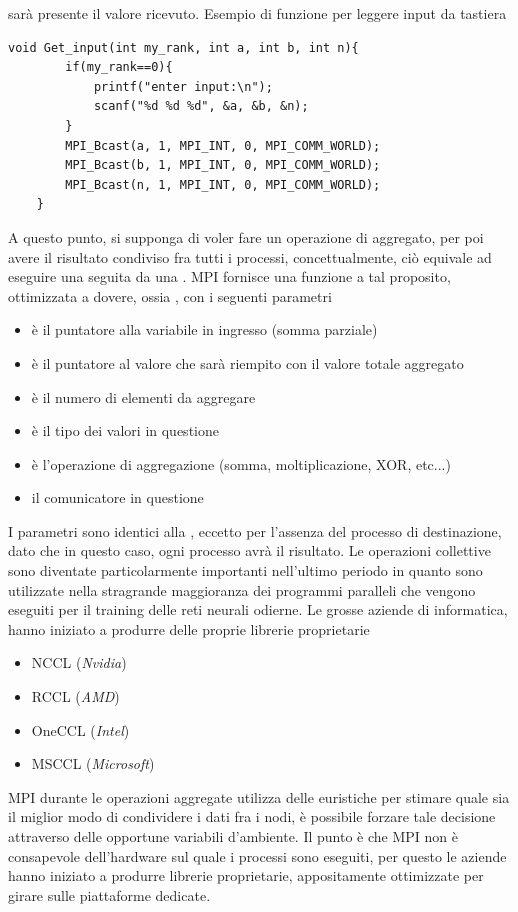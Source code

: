 \documentclass[10pt, letterpaper]{report}
\begin{document}
sarà presente il valore ricevuto.\acc 
Esempio di funzione per leggere input da tastiera 
\begin{lstlisting}[style=CStyle]
    void Get_input(int my_rank, int a, int b, int n){
        if(my_rank==0){
            printf("enter input:\n");
            scanf("%d %d %d", &a, &b, &n);
        }
        MPI_Bcast(a, 1, MPI_INT, 0, MPI_COMM_WORLD);
        MPI_Bcast(b, 1, MPI_INT, 0, MPI_COMM_WORLD);
        MPI_Bcast(n, 1, MPI_INT, 0, MPI_COMM_WORLD);
    }
\end{lstlisting}
A questo punto, si supponga di voler fare un operazione di aggregato, per poi avere il risultato condiviso fra tutti 
i processi, concettualmente, ciò equivale ad eseguire una  seguita da una . MPI 
fornisce una funzione a tal proposito, ottimizzata a dovere, ossia , con i seguenti parametri\begin{itemize}
    \item {} è il puntatore alla variabile in ingresso (somma parziale)
    \item {} è il puntatore al valore che sarà riempito con il valore totale aggregato
    \item {} è il numero di elementi da aggregare
    \item {} è il tipo dei valori in questione
    \item {} è l'operazione di aggregazione (somma, moltiplicazione, XOR, etc...) 
    \item {} il comunicatore in questione
\end{itemize}
I parametri sono identici alla ,  eccetto per l'assenza del processo di destinazione, dato che 
in questo caso, ogni processo avrà il risultato.\acc 
Le operazioni collettive sono diventate particolarmente importanti nell'ultimo periodo in quanto sono 
utilizzate nella stragrande maggioranza dei programmi paralleli che vengono eseguiti per il training delle 
reti neurali odierne. Le grosse aziende di informatica, hanno iniziato a produrre delle proprie librerie 
proprietarie\begin{itemize}
    \item NCCL (\textit{Nvidia})
    \item RCCL (\textit{AMD})
    \item OneCCL (\textit{Intel})
    \item MSCCL (\textit{Microsoft})
\end{itemize}
MPI durante le operazioni aggregate utilizza delle euristiche per stimare quale sia il miglior modo di condividere 
i dati fra i nodi, è possibile forzare tale decisione attraverso delle opportune variabili d'ambiente. Il punto è che MPI
non è consapevole dell'hardware sul quale i processi sono eseguiti, per questo le aziende hanno iniziato a 
produrre librerie proprietarie, appositamente ottimizzate per girare sulle piattaforme dedicate.
\end{document}
